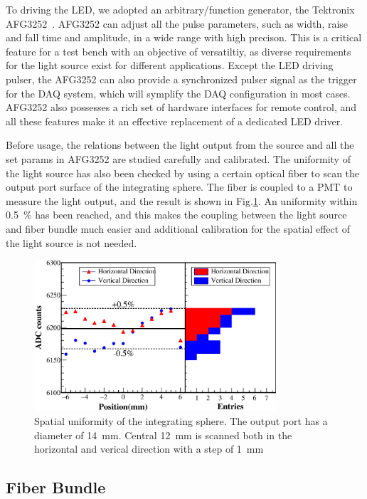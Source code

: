\documentclass[5p, times]{elsarticle}
\begin{document}
To driving the LED, we adopted an arbitrary/function generator, the Tektronix AFG3252~\cite{afg3252}. AFG3252 can adjust all the pulse parameters, such as width, raise and fall time and amplitude, in a wide range with high precison. This is a critical feature for a test bench with an objective of versatiltiy, as diverse requirements for the light source exist for different applications. 
Except the LED driving pulser, the AFG3252 can also provide a synchronized pulser signal as the trigger for the DAQ system, which will symplify the DAQ configuration in most cases. 
AFG3252 also possesses a rich set of hardware interfaces for remote control, and all these features make it an effective replacement of a dedicated LED driver. 

Before usage, the relations between the light output from the source and all the set params in AFG3252 are studied carefully and calibrated. The uniformity of the light source has also been checked by using a certain optical fiber to scan the output port surface of the integrating sphere. The fiber is coupled to a PMT to measure the light output, and the result is shown in Fig.\ref{fig:uniformity_integratingsphere}. An uniformity within \textpm\SI{0.5}{\percent} has been reached, and this makes the coupling between the light source and fiber bundle much easier and additional calibration for the spatial effect of the light source is not needed. 

\begin{figure}
 \centering
 \includegraphics[width=90mm]{uniformity_integratingsphere}
\caption{Spatial uniformity of the integrating sphere.
The output port has a diameter of \SI{14}{\milli\meter}.
Central \SI{12}{\milli\meter} is scanned both in the horizontal and verical direction with a step of \SI{1}{\milli\meter}}
\label{fig:uniformity_integratingsphere}
\end{figure} 

\subsection{Fiber Bundle}
\label{sec:fiber_bundle}
\end{document}
